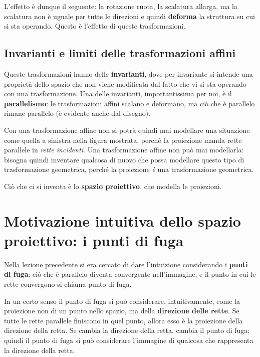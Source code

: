 L'effetto è dunque il seguente: la rotazione ruota, la scalatura allarga, ma la scalatura non è uguale per tutte le direzioni e quindi \textbf{deforma} la struttura su cui si sta operando. Questo è l'effetto di queste trasformazioni.

\subsection{Invarianti e limiti delle trasformazioni affini}

Queste trasformazioni hanno delle \textbf{invarianti}, dove per invariante si intende una proprietà dello spazio che non viene modificata dal fatto che vi si sta operando con una trasformazione. Una delle invarianti, importantissima per noi, è il \textbf{parallelismo}: le trasformazioni affini scalano e deformano, ma ciò che è parallelo rimane parallelo (è evidente anche dal disegno).

Con una trasformazione affine non si potrà quindi mai modellare una situazione come quella a sinistra nella figura mostrata, perché la proiezione manda rette parallele in \emph{rette incidenti}. Una trasformazione affine non può mai modellarla: bisogna quindi inventare qualcosa di nuovo che possa modellare questo tipo di trasformazione geometrica, perché la proiezione \emph{è} una trasformazione geometrica.

Ciò che ci si inventa è lo \textbf{spazio proiettivo}, che modella le proiezioni.

\section{Motivazione intuitiva dello spazio proiettivo: i punti di fuga}

Nella lezione precedente si era cercato di dare l'intuizione considerando i \textbf{punti di fuga}: ciò che è parallelo diventa convergente nell'immagine, e il punto in cui le rette convergono si chiama punto di fuga.

In un certo senso il punto di fuga si può considerare, intuitivamente, come la proiezione non di un punto nello spazio, ma della \textbf{direzione delle rette}. Se tutte le rette parallele finiscono in quel punto, allora esso è la proiezione della direzione della retta. Se cambia la direzione della retta, cambia il punto di fuga; quindi il punto di fuga si può considerare l'immagine di qualcosa che rappresenta la direzione della retta.

